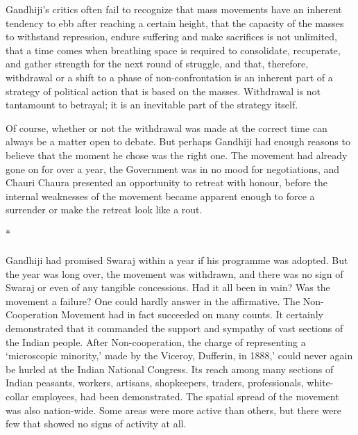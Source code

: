 \begin{multicols}{2}
Gandhiji's critics often fail to recognize that mass movements have an inherent tendency to ebb after reaching a certain height, that the capacity of the masses to withstand repression, endure suffering and make sacrifices is not unlimited, that a time comes when breathing space is required to consolidate, recuperate, and gather strength for the next round of struggle, and that, therefore, withdrawal or a shift to a phase of non-confrontation is an inherent part of a strategy of political action that is based on the masses. Withdrawal is not tantamount to betrayal; it is an inevitable part of the strategy itself. 

Of course, whether or not the withdrawal was made at the correct time can always be a matter open to debate. But perhaps Gandhiji had enough reasons to believe that the moment he chose was the right one. The movement had already gone on for over a year, the Government was in no mood for negotiations, and Chauri Chaura presented an opportunity to retreat with honour, before the internal weaknesses of the movement became apparent enough to force a surrender or make the retreat look like a rout.

\begin{center}*\end{center}

\paragraph*{}

Gandhiji had promised Swaraj within a year if his programme was adopted. But the year was long over, the movement was withdrawn, and there was no sign of Swaraj or even of any tangible concessions. Had it all been in vain? Was the movement a failure? One could hardly answer in the affirmative. The Non- Cooperation Movement had in fact succeeded on many counts. It certainly demonstrated that it commanded the support and sympathy of vast sections of the Indian people. After Non-cooperation, the charge of representing a `microscopic minority,' made by the Viceroy, Dufferin, in 1888,' could never again be hurled at the Indian National Congress. Its reach among many sections of Indian peasants, workers, artisans, shopkeepers, traders, professionals, white-collar employees, had been demonstrated. The spatial spread of the movement was also nation-wide. Some areas were more active than others, but there were few that showed no signs of activity at all. 


\end{multicols}
